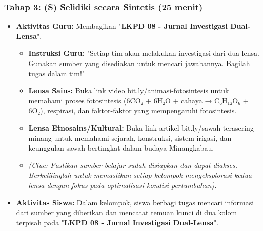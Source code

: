 \documentclass[a4paper,12pt]{article}
\begin{document}
\subsubsection{Tahap 3: (S) Selidiki secara Sintetis (25 menit)}
\begin{itemize}
\item \textbf{Aktivitas Guru:} Membagikan "\textbf{LKPD 08 - Jurnal Investigasi Dual-Lensa}".
    \begin{itemize}
    \item \textbf{Instruksi Guru:} "Setiap tim akan melakukan investigasi dari dua lensa. Gunakan sumber yang disediakan untuk mencari jawabannya. Bagilah tugas dalam tim!"
    \item \textbf{Lensa Sains:} Buka link video bit.ly/animasi-fotosintesis untuk memahami proses fotosintesis (6CO₂ + 6H₂O + cahaya → C₆H₁₂O₆ + 6O₂), respirasi, dan faktor-faktor yang mempengaruhi fotosintesis.
    \item \textbf{Lensa Etnosains/Kultural:} Buka link artikel bit.ly/sawah-terasering-minang untuk memahami sejarah, konstruksi, sistem irigasi, dan keunggulan sawah bertingkat dalam budaya Minangkabau.
    \item \textit{(Clue: Pastikan sumber belajar sudah disiapkan dan dapat diakses. Berkelilinglah untuk memastikan setiap kelompok mengeksplorasi kedua lensa dengan fokus pada optimalisasi kondisi pertumbuhan).}
    \end{itemize}
\item \textbf{Aktivitas Siswa:} Dalam kelompok, siswa berbagi tugas mencari informasi dari sumber yang diberikan dan mencatat temuan kunci di dua kolom terpisah pada "\textbf{LKPD 08 - Jurnal Investigasi Dual-Lensa}".
\end{itemize}
\end{document}
